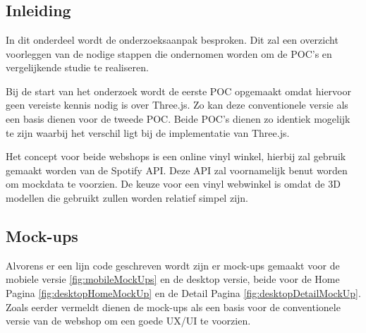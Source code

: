 
\chapter{}%
\label{ch:methodologie}

\section{Inleiding}

In dit onderdeel wordt de onderzoeksaanpak besproken. Dit zal een overzicht voorleggen van de  nodige stappen die ondernomen worden om de POC's en vergelijkende studie te realiseren.

Bij de start van het onderzoek wordt de eerste POC opgemaakt omdat hiervoor geen vereiste kennis nodig is over Three.js. Zo kan deze conventionele versie als een basis dienen voor de tweede POC. Beide POC's dienen zo identiek mogelijk te zijn waarbij het verschil ligt bij de implementatie van Three.js.

Het concept voor beide webshops is een online vinyl winkel, hierbij zal gebruik gemaakt worden van de Spotify API. Deze API zal voornamelijk benut worden om mockdata te voorzien. De keuze voor een vinyl webwinkel is omdat de 3D modellen die gebruikt zullen worden relatief simpel zijn.

\section{Mock-ups}

Alvorens er een lijn code geschreven wordt zijn er mock-ups gemaakt voor de mobiele versie \ref{fig:mobileMockUps} en de desktop versie, beide voor de Home Pagina \ref{fig:desktopHomeMockUp} en de Detail Pagina \ref{fig:desktopDetailMockUp}. Zoals eerder vermeldt dienen de mock-ups als een basis voor de conventionele versie van de webshop om een goede UX/UI te voorzien.


